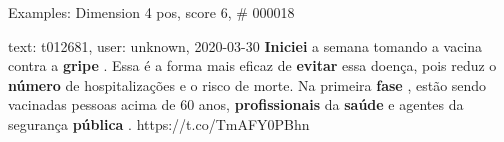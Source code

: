 \begin{frame}{Examples: Dimension 4 pos, score 6, \# 000018}
\footnotesize
\begin{exampleblock}{text: t012681, user: unknown, 2020-03-30}
\textbf{Iniciei} a semana tomando a vacina contra a \textbf{gripe} . Essa é a 
forma mais eficaz de \textbf{evitar} essa doença, pois reduz o \textbf{número} 
de hospitalizações e o risco de morte. Na primeira \textbf{fase} , estão sendo 
vacinadas pessoas acima de 60 anos, \textbf{profissionais} da \textbf{saúde} e 
agentes da segurança \textbf{pública} . https://t.co/TmAFY0PBhn 
\end{exampleblock}
\end{frame}
